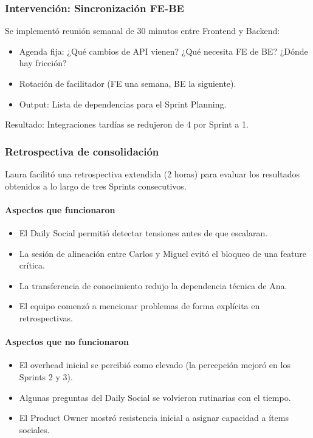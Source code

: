 \subsubsection{Intervención: Sincronización FE-BE}

Se implementó reunión semanal de 30 minutos entre Frontend y Backend:

\begin{itemize}
    \item Agenda fija: ¿Qué cambios de API vienen? ¿Qué necesita FE de BE? ¿Dónde hay fricción?
    \item Rotación de facilitador (FE una semana, BE la siguiente).
    \item Output: Lista de dependencias para el Sprint Planning.
\end{itemize}

Resultado: Integraciones tardías se redujeron de 4 por Sprint a 1.

\subsubsection{Retrospectiva de consolidación}

Laura facilitó una retrospectiva extendida (2 horas) para evaluar los resultados obtenidos a lo largo de tres Sprints consecutivos.

\paragraph{Aspectos que funcionaron}
\begin{itemize}
    \item El Daily Social permitió detectar tensiones antes de que escalaran.
    \item La sesión de alineación entre Carlos y Miguel evitó el bloqueo de una feature crítica.
    \item La transferencia de conocimiento redujo la dependencia técnica de Ana.
    \item El equipo comenzó a mencionar problemas de forma explícita en retrospectivas.
\end{itemize}

\paragraph{Aspectos que no funcionaron}
\begin{itemize}
    \item El overhead inicial se percibió como elevado (la percepción mejoró en los Sprints 2 y 3).
    \item Algunas preguntas del Daily Social se volvieron rutinarias con el tiempo.
    \item El Product Owner mostró resistencia inicial a asignar capacidad a ítems sociales.
\end{itemize}

